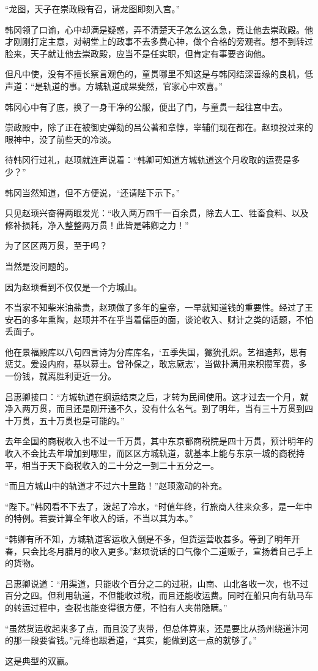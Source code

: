 “龙图，天子在崇政殿有召，请龙图即刻入宫。”

韩冈领了口谕，心中却满是疑惑，弄不清楚天子怎么这么急，竟让他去崇政殿。他才刚刚打定主意，对朝堂上的政事不去多费心神，做个合格的旁观者。想不到转过脸来，天子就让他去崇政殿，应当不是任实职，但肯定有事要咨询他。

但凡中使，没有不擅长察言观色的，童贯哪里不知这是与韩冈结深善缘的良机，低声道：“是轨道的事。方城轨道成果斐然，官家心中欢喜。”

韩冈心中有了底，换了一身干净的公服，便出了门，与童贯一起往宫中去。

崇政殿中，除了正在被御史弹劾的吕公著和章惇，宰辅们现在都在。赵顼投过来的眼神中，没了前些天的冷淡。

待韩冈行过礼，赵顼就连声说着：“韩卿可知道方城轨道这个月收取的运费是多少？”

韩冈当然知道，但不方便说，“还请陛下示下。”

只见赵顼兴奋得两眼发光：“收入两万四千一百余贯，除去人工、牲畜食料、以及修补损耗，净入整整两万贯！此皆是韩卿之力！”

为了区区两万贯，至于吗？

当然是没问题的。

因为赵顼看到不仅仅是一个方城山。

不当家不知柴米油盐贵，赵顼做了多年的皇帝，一早就知道钱的重要性。经过了王安石的多年熏陶，赵顼并不在乎当着儒臣的面，谈论收入、财计之类的话题，不怕丢面子。

他在景福殿库以八句四言诗为分库库名，‘五季失国，玁狁孔炽。艺祖造邦，思有惩艾。爰设内府，基以募士。曾孙保之，敢忘厥志’，当做扑满用来积攒军费，多一份钱，就离胜利更近一分。

吕惠卿接口：“方城轨道在纲运结束之后，才转为民间使用。这才过去一个月，就净入两万贯，而且还是刚开通不久，没有什么名气。到了明年，当有三十万贯到四十万贯，五十万贯也是可能的。”

去年全国的商税收入也不过一千万贯，其中东京都商税院是四十万贯，预计明年的收入不会比去年增加到哪里，而区区方城轨道，就基本上能与东京一城的商税持平，相当于天下商税收入的二十分之一到二十五分之一。

“而且方城山中的轨道才不过六十里路！”赵顼激动的补充。

“陛下。”韩冈看不下去了，泼起了冷水，“时值年终，行旅商人往来众多，是一年中的特例。若要计算全年收入的话，不当以其为本。”

“韩卿有所不知，方城轨道客运收入倒是不多，但货运营收甚多。等到了明年开春，只会比冬月腊月的收入更多。”赵顼说话的口气像个二道贩子，宣扬着自己手上的货物。

吕惠卿说道：“用渠道，只能收个百分之二的过税，山南、山北各收一次，也不过百分之四。但利用轨道，不但能收过税，而且还能收运费。同时在船只向有轨马车的转运过程中，查税也能变得很方便，不怕有人夹带隐瞒。”

“虽然货运收起来多了点，而且没了夹带，但总体算来，还是要比从扬州绕道汴河的那一段要省钱。”元绛也跟着道，“其实，能做到这一点的就够了。”

这是典型的双赢。

